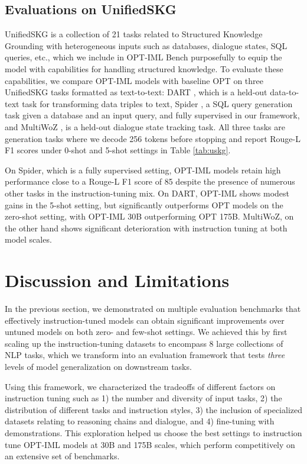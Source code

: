 \subsection{Evaluations on UnifiedSKG}

UnifiedSKG \citep{xie2022unifiedskg} is a collection of 21 tasks related to Structured Knowledge Grounding with heterogeneous inputs such as databases, dialogue states, SQL queries, etc., which we include in OPT-IML Bench purposefully to equip the model with capabilities for handling structured knowledge. To evaluate these capabilities, we compare OPT-IML models with baseline OPT on three UnifiedSKG tasks formatted as text-to-text: DART \citep{nan2020dart}, which is a held-out data-to-text task for transforming data triples to text, Spider \citep{yu2018spider}, a SQL query generation task given a database and an input query, and fully supervised in our framework, and MultiWoZ \citep{budzianowski2018multiwoz}, is a held-out dialogue state tracking task. All three tasks are generation tasks where we decode 256 tokens before stopping and report Rouge-L F1 scores under 0-shot and 5-shot settings in Table \ref{tab:uskg}. 

On Spider, which is a fully supervised setting, OPT-IML models retain high performance close to a Rouge-L F1 score of 85  despite the presence of numerous other tasks in the instruction-tuning mix. On DART, OPT-IML shows modest gains in the 5-shot setting, but significantly outperforms OPT models on the zero-shot setting, with OPT-IML 30B outperforming OPT 175B. MultiWoZ, on the other hand shows significant deterioration with instruction tuning at both model scales.

\section{Discussion and Limitations}
\label{sec:discussion}
In the previous section, we demonstrated on multiple evaluation benchmarks that effectively instruction-tuned models can obtain significant improvements over untuned models on both zero- and few-shot settings. We achieved this by first scaling up the instruction-tuning datasets to encompass 8 large collections of NLP tasks, which we transform into an evaluation framework that tests \emph{three} levels of model generalization on downstream tasks. 

Using this framework, we characterized the tradeoffs of different factors on instruction tuning such as 1) the number and diversity of input tasks, 2) the distribution of different tasks and instruction styles, 3) the inclusion of specialized datasets relating to reasoning chains and dialogue, and 4) fine-tuning with demonstrations. This exploration helped us choose the best settings to instruction tune OPT-IML models at 30B and 175B scales, which perform competitively on an extensive set of benchmarks. 

